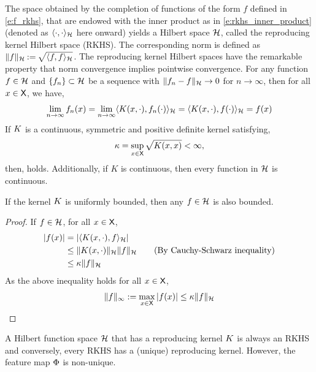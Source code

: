 The space obtained by the completion of functions of the form $f$ defined in \eqref{e:f_rkhs}, that are endowed with the inner product as in \eqref{e:rkhs_inner_product} (denoted as $\langle \cdot, \cdot \rangle_{{\cal H}}$ here onward) yields a Hilbert space ${\cal H}$, called the reproducing kernel Hilbert space (RKHS). The corresponding norm is defined as $\|f\|_{\cal H} \mathbin{:=} \sqrt{\langle f, f \rangle_{\cal H}}$. The reproducing kernel Hilbert spaces have the remarkable property that norm convergence implies pointwise convergence. 
For any function $f\in{\cal H}$ and $\{f_n\}\subset {\cal H}$ be a sequence with $\|f_n - f\|_{\cal H} \to 0$ for $n \to \infty$, then for all $x \in {\sf X}$, we have,
\begin{equation}
\lim_{n\to\infty} f_n(x) = \lim_{n \to \infty} \langle K(x,\cdot),  f_n(\cdot) \rangle_{\cal H} = \langle K(x, \cdot), f(\cdot) \rangle_{\cal H} = f(x)
\end{equation}
If $K$ is a continuous, symmetric and positive definite kernel satisfying, 
\begin{equation}
\kappa = \sup_{x \in {\sf X}} \sqrt{K(x,x)} < \infty,
\end{equation}
then,  holds. Additionally, if $K$ is continuous, then every function in ${\cal H}$ is continuous. 

\begin{proposition}
\label{prop:RKHS_bounded}
	If the kernel $K$ is uniformly bounded, then any $f \in {\cal H}$ is also bounded. 
\end{proposition}
\begin{proof}
	If $f \in {\cal H}$, for all $x \in {\sf X}$,
	\begin{equation}
	\begin{aligned}
	|f(x)| &= |\langle K(x,\cdot), f \rangle_{\cal H}| \\
	& \leq \|K(x,\cdot)\|_{\cal H} \|f\|_{\cal H} \qquad{\text{(By Cauchy-Schwarz inequality)}}\\ 
	& \leq \kappa \|f\|_{\cal H}
	\end{aligned}
	\end{equation}
	As the above inequality holds for all $x \in {\sf X}$, 
	\begin{equation}
	\|f\|_\infty := \max_{x\in {\sf X}}|f(x)| \leq \kappa \|f\|_{\cal H}
	\end{equation}
\end{proof}
A Hilbert function space ${\cal H}$ that has a reproducing kernel $K$ is always an RKHS and conversely, every RKHS has a (unique) reproducing kernel. However, the feature map $\Phi$ is non-unique.  
